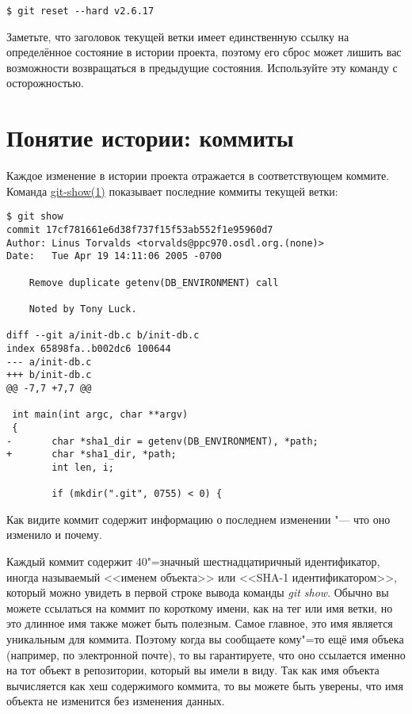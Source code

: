 \documentclass[a4paper, 12pt]{report}
\begin{document}
\begin{lstlisting}
$ git reset --hard v2.6.17
\end{lstlisting}

Заметьте, что заголовок текущей ветки имеет единственную ссылку на определённое состояние
в истории проекта, поэтому его сброс может лишить вас возможности возвращаться в
предыдущие состояния. Используйте эту команду с осторожностью.


\section{Понятие истории: коммиты}

Каждое изменение в истории проекта отражается в соответствующем коммите. Команда
\href{http://www.kernel.org/pub/software/scm/git/docs/git-show.html}{git-show(1)}
показывает последние коммиты текущей ветки:

\begin{lstlisting}
$ git show
commit 17cf781661e6d38f737f15f53ab552f1e95960d7
Author: Linus Torvalds <torvalds@ppc970.osdl.org.(none)>
Date:   Tue Apr 19 14:11:06 2005 -0700

    Remove duplicate getenv(DB_ENVIRONMENT) call

    Noted by Tony Luck.

diff --git a/init-db.c b/init-db.c
index 65898fa..b002dc6 100644
--- a/init-db.c
+++ b/init-db.c
@@ -7,7 +7,7 @@

 int main(int argc, char **argv)
 {
-       char *sha1_dir = getenv(DB_ENVIRONMENT), *path;
+       char *sha1_dir, *path;
        int len, i;

        if (mkdir(".git", 0755) < 0) {
\end{lstlisting}

Как видите коммит содержит информацию о последнем изменении "--- что оно изменило
и почему.

Каждый коммит содержит 40"=значный шестнадцатиричный идентификатор, иногда называемый
<<именем объекта>> или <<SHA-1 идентификатором>>, который можно увидеть в первой
строке вывода команды \emph{git show}. Обычно вы можете ссылаться на коммит по
короткому имени, как на тег или имя ветки, но это длинное имя также может быть
полезным. Самое главное, это имя является уникальным для коммита. Поэтому когда
вы сообщаете кому"=то ещё имя объека (например, по электронной почте), то вы
гарантируете, что оно ссылается именно на тот объект в репозитории, который вы
имели в виду. Так как имя объекта вычисляется как хеш содержимого коммита, то вы
можете быть уверены, что имя объекта не изменится без изменения данных.
\end{document}
